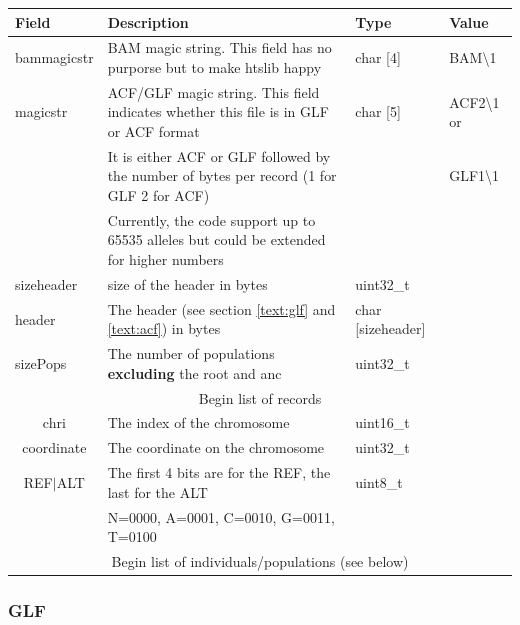 \documentclass[a4paper]{article}
\begin{document}

\noindent \begin{tabular}{|l|p{5cm}|l|l|}
\hline
{\bf Field} & {\bf Description} & {\bf Type} & {\bf Value} \\
\hline
bammagicstr & BAM magic string. This field has no purporse but to make htslib happy & char [4] & BAM\textbackslash1 \\
\hline
magicstr & ACF/GLF magic string. This field indicates whether this file is in GLF or ACF format & char [5] & ACF2\textbackslash1 or \\
         &  It is either ACF or GLF followed by the number of bytes per record (1 for GLF 2 for ACF)   &          & GLF1\textbackslash1 \\
         &  Currently, the code support up to 65535 alleles but could be extended for higher numbers   &          &  \\
\hline
sizeheader & size of the header in bytes   & uint32\_t         & \\
\hline
header     & The header (see section \ref{text:glf} and \ref{text:acf}) in bytes           & char [sizeheader] & \\
\hline
sizePops   & The number of populations {\bf excluding}  the root and anc & uint32\_t         & \\
\hline
\multicolumn{4}{|c|}{Begin list of records} \\
\hline
\multicolumn{1}{|c|}{chri}   & The index of the chromosome & uint16\_t         & \\
\hline
\multicolumn{1}{|c|}{coordinate}   & The coordinate on the chromosome & uint32\_t         & \\
\hline
\multicolumn{1}{|c|}{REF$\vert$ALT}     & The first 4 bits are for the REF, the last for the ALT & uint8\_t         & \\
                                & N=0000, A=0001, C=0010, G=0011, T=0100                  &          & \\
\hline
\multicolumn{4}{|c|}{Begin list of individuals/populations (see below)} \\
\hline
\end{tabular}

\afterpage{\clearpage}


\subsubsection{GLF}
\end{document}
